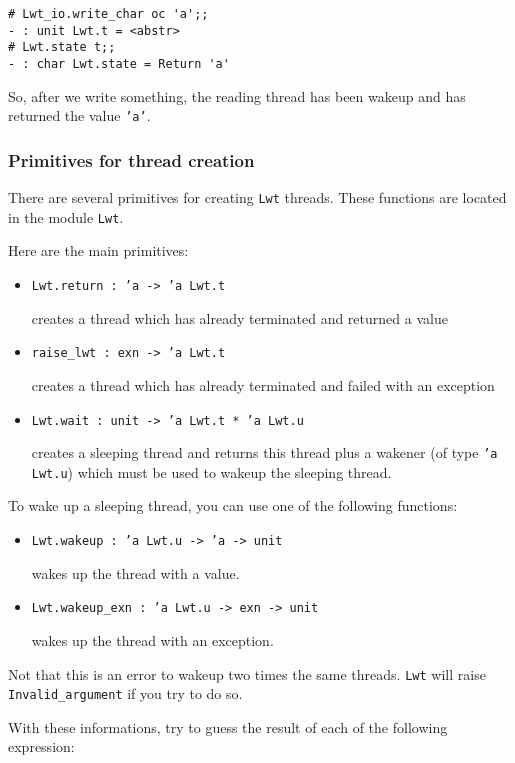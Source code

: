 \documentclass{article}
\newcommand{\lwt}{\texttt{Lwt}\xspace}
\begin{document}
\begin{verbatim}
# Lwt_io.write_char oc 'a';;
- : unit Lwt.t = <abstr>
# Lwt.state t;;
- : char Lwt.state = Return 'a'
\end{verbatim}

So, after we write something, the reading thread has been wakeup and
has returned the value \texttt{'a'}.

\subsubsection{Primitives for thread creation}

There are several primitives for creating \lwt threads. These
functions are located in the module \texttt{Lwt}.

Here are the main primitives:

\begin{itemize}
\item \texttt{Lwt.return : 'a -> 'a Lwt.t}

  creates a thread which has already terminated and returned a value
\item \texttt{raise_lwt : exn -> 'a Lwt.t}

  creates a thread which has already terminated and failed with an
  exception
\item \texttt{Lwt.wait : unit -> 'a Lwt.t * 'a Lwt.u}

  creates a sleeping thread and returns this thread plus a wakener (of
  type \texttt{'a Lwt.u}) which must be used to wakeup the sleeping
  thread.
\end{itemize}

To wake up a sleeping thread, you can use one of the following
functions:

\begin{itemize}
\item \texttt{Lwt.wakeup : 'a Lwt.u -> 'a -> unit}

  wakes up the thread with a value.
\item \texttt{Lwt.wakeup\_exn : 'a Lwt.u -> exn -> unit}

  wakes up the thread with an exception.
\end{itemize}

Not that this is an error to wakeup two times the same threads. \lwt
will raise \texttt{Invalid\_argument} if you try to do so.

With these informations, try to guess the result of each of the
following expression:
\end{document}
